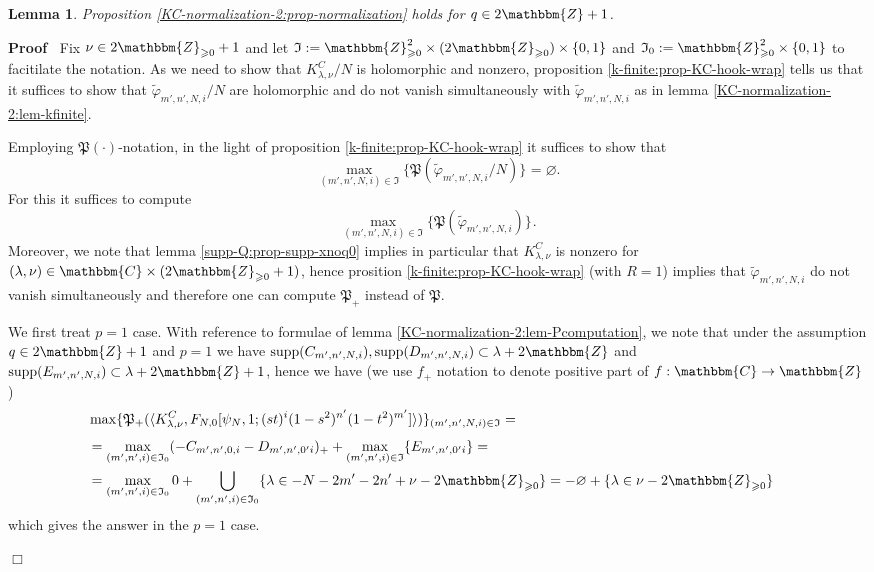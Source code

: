 \documentclass{article}
\newcommand{\assign}{:=}
\newcommand{\tmop}[1]{\ensuremath{\operatorname{#1}}}
\newenvironment{proof}{\noindent\textbf{Proof\ }}{\hspace*{\fill}$\Box$\medskip}
\numberwithin{definition}{section}
\newtheorem{lemma}{Lemma}
\numberwithin{lemma}{section}
\numberwithin{proposition}{section}
{\theorembodyfont{\rmfamily}\newtheorem{remark}{Remark}
\numberwithin{remark}{section}
}
\begin{document}
\begin{lemma}
  \label{KC-normalization-2:lem-normalization-qodd}Proposition
  \ref{KC-normalization-2:prop-normalization} holds for $q \in 2\mathbbm{Z}+
  1$.
\end{lemma}

\begin{proof}
  Fix $\nu \in 2\mathbbm{Z}_{\geqslant 0} + 1$ and let $\mathfrak{I} \assign
  \mathbbm{Z}_{\geqslant 0}^2 \times ( 2\mathbbm{Z}_{\geqslant 0}) \times \{
  0, 1 \}$ and $\mathfrak{I}_0 \assign \mathbbm{Z}_{\geqslant 0}^2 \times \{
  0, 1 \}$ to facitilate the notation. As we need to show that $K_{\lambda,
  \nu}^C / N$ is holomorphic and nonzero, proposition
  \ref{k-finite:prop-KC-hook-wrap} tells us that it suffices to show that
  $\tilde{\varphi}_{m', n', N, i} / N$ are holomorphic and do not vanish
  simultaneously with $\tilde{\varphi}_{m', n', N, i}$ as in lemma
  \ref{KC-normalization-2:lem-kfinite}.
  
  Employing $\mathfrak{P} ( \cdot)$-notation, in the light of proposition
  \ref{k-finite:prop-KC-hook-wrap} it suffices to show that
  \[ \max_{( m', n', N, i) \in \mathfrak{I}} \{ \mathfrak{P} (
     \tilde{\varphi}_{m', n', N, i} / N) \}_{} = \varnothing . \]
  For this it suffices to compute
  \[ \max_{( m', n', N, i) \in \mathfrak{I}} \{ \mathfrak{P} (
     \tilde{\varphi}_{m', n', N, i}) \}_{} . \]
  Moreover, we note that lemma \ref{supp-Q:prop-supp-xnoq0} implies in
  particular that $K_{\lambda, \nu}^C$ is nonzero for $( \lambda, \nu) \in
  \mathbbm{C} \times ( 2\mathbbm{Z}_{\geqslant 0} + 1)$, hence prosition
  \ref{k-finite:prop-KC-hook-wrap} (with $R = 1$) implies that
  $\tilde{\varphi}_{m', n', N, i}$ do not vanish simultaneously and therefore
  one can compute $\mathfrak{P}_+$ instead of $\mathfrak{P}$.
  
  We first treat $p = 1$ case. With reference to formulae of lemma
  \ref{KC-normalization-2:lem-Pcomputation}, we note that under the assumption
  $q \in 2\mathbbm{Z}+ 1$ and $p = 1$ we have $\tmop{supp} ( C_{m', n', N,
  i}), \tmop{supp} ( D_{m', n', N, i}) \subset \lambda + 2\mathbbm{Z}$ and
  $\tmop{supp} ( E_{m', n', N, i}) \subset \lambda + 2\mathbbm{Z}+ 1$, hence
  we have (we use $f_+$ notation to denote positive part of $f : \mathbbm{C}
  \rightarrow \mathbbm{Z}$)
  \begin{eqnarray}
    & \max_{} \{ \mathfrak{P}_+ ( \langle K_{\lambda, \nu}^C, F_{N, 0} [
    \psi_N, 1 ; ( s t)^i ( 1 - s^2)^{n'} ( 1 - t^2)^{m'}] \rangle) \}_{( m',
    n', N, i) \in \mathfrak{I}} = &  \nonumber\\
    & = \max_{( m', n', i) \in \mathfrak{I}_0} ( - C_{m', n', 0, i} - D_{m',
    n', 0' i})_+ + \max_{( m', n', i) \in \mathfrak{I}} \{ E_{m', n', 0' i} \}
    = &  \nonumber\\
    & = \max_{( m', n', i) \in \mathfrak{I}_0} 0 + \bigcup_{( m', n', i) \in
    \mathfrak{I}_0} \{ \lambda \in - N - 2 m' - 2 n' + \nu -
    2\mathbbm{Z}_{\geqslant 0} \} = - \varnothing + \{ \lambda \in \nu -
    2\mathbbm{Z}_{\geqslant 0} \} &  \nonumber
  \end{eqnarray}
  which gives the answer in the $p = 1$ case.
  

\end{proof}
\end{document}

